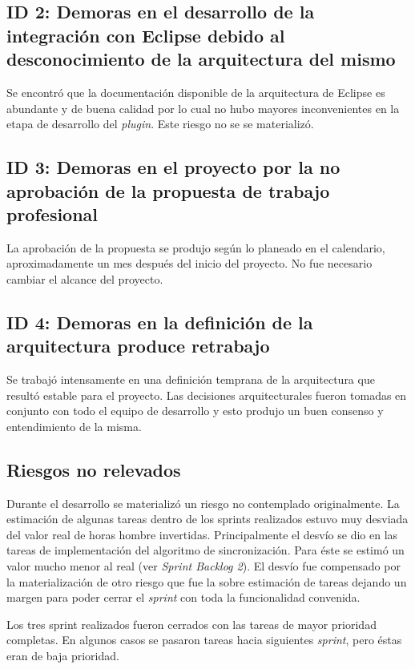 \documentclass[12pt,a4paper]{article}
\begin{document}
\subsection{ID 2: Demoras en el desarrollo de la integración con Eclipse debido al desconocimiento de la 
arquitectura del mismo}
Se encontró que la documentación disponible de la arquitectura de Eclipse es abundante y de buena calidad por
lo cual no hubo mayores inconvenientes en la etapa de desarrollo del \textit{plugin}. Este riesgo no se se
materializó.

\subsection{ID 3: Demoras en el proyecto por la no aprobación de la propuesta de trabajo profesional}
La aprobación de la propuesta se produjo según lo planeado en el calendario, aproximadamente un mes después del
inicio del proyecto. No fue necesario cambiar el alcance del proyecto.

\subsection{ID 4: Demoras en la definición de la arquitectura produce retrabajo}
Se trabajó intensamente en una definición temprana de la arquitectura que resultó estable para el proyecto. Las
decisiones arquitecturales fueron tomadas en conjunto con todo el equipo de desarrollo y esto produjo un buen
consenso y entendimiento de la misma.

\subsection{Riesgos no relevados}
Durante el desarrollo se materializó un riesgo no contemplado originalmente. La estimación de algunas tareas dentro
de los sprints \cite{sprint} realizados estuvo muy desviada del valor real de horas hombre invertidas. Principalmente el desvío se
dio en las tareas de implementación del algoritmo de sincronización. Para éste se estimó un valor mucho menor al real (ver
\textit{Sprint Backlog 2}). El desvío fue compensado por la materialización de otro riesgo que fue la sobre estimación
de tareas dejando un margen para poder cerrar el \textit{sprint} con toda la funcionalidad convenida.

Los tres sprint realizados fueron cerrados con las tareas de mayor prioridad completas. En algunos casos se pasaron 
tareas hacia siguientes \textit{sprint}, pero éstas eran de baja prioridad.
\end{document}
